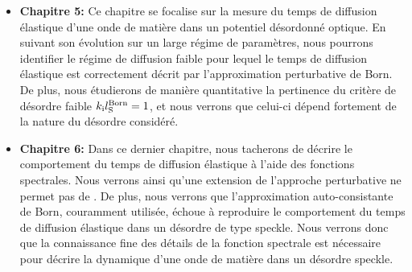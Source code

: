 \begin{itemize}
\item[\textendash] \textbf{Chapitre 5:} Ce chapitre se focalise sur la mesure du temps de diffusion élastique d'une onde de matière dans un potentiel désordonné optique. En suivant son évolution sur un large régime de paramètres, nous pourrons identifier le régime de diffusion faible pour lequel le temps de diffusion élastique est correctement décrit par l'approximation perturbative de Born. De plus, nous étudierons de manière quantitative la pertinence du critère de désordre faible $k_{\mathrm{i}}l_{\mathrm{S}}^{\mathrm{Born}}=1$, et nous verrons que celui-ci dépend fortement de la nature du désordre considéré. \\

\item[\textendash] \textbf{Chapitre 6:} Dans ce dernier chapitre, nous tacherons de décrire le comportement du temps de diffusion élastique à l'aide des fonctions spectrales. Nous verrons ainsi qu'une extension de l'approche perturbative ne permet pas de . De plus, nous verrons que l'approximation auto-consistante de Born, couramment utilisée, échoue à reproduire le comportement du temps de diffusion élastique dans un désordre de type speckle. Nous verrons donc que la connaissance fine des détails de la fonction spectrale est nécessaire pour décrire la dynamique d'une onde de matière dans un désordre speckle.
\end{itemize}


